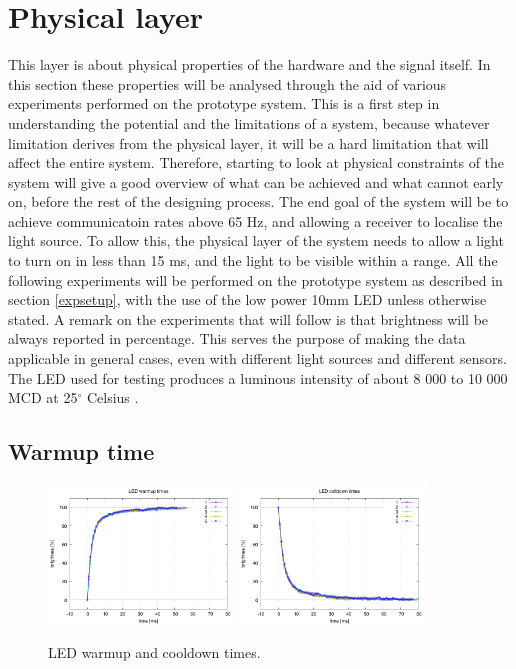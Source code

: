 \section{Physical layer}
\label{physical}

This layer is about physical properties of the hardware and the signal itself.
In this section these properties will be analysed through the aid of various experiments performed on the prototype system.
This is a first step in understanding the potential and the limitations of a system, because whatever limitation derives from the physical layer, it will be a hard limitation that will affect the entire system.
Therefore, starting to look at physical constraints of the system will give a good overview of what can be achieved and what cannot early on, before the rest of the designing process.
The end goal of the system will be to achieve communicatoin rates above 65 Hz, and allowing a receiver to localise the light source.
To allow this, the physical layer of the system needs to allow a light to turn on in less than 15 ms, and the light to be visible within a range.
All the following experiments will be performed on the prototype system as described in section \ref{expsetup}, with the use of the low power 10mm LED unless otherwise stated.
A remark on the experiments that will follow is that brightness will be always reported in percentage.
This serves the purpose of making the data applicable in general cases, even with different light sources and different sensors.
The LED used for testing produces a luminous intensity of about 8 000 to 10 000 MCD at 25$^{\circ}$ Celsius \cite{ledDS}.

\subsection{Warmup time}

\begin{figure}[h]
\centering
\includegraphics[height=140px]{img/warmup1}
\includegraphics[height=140px]{img/warmdown1}
\caption{LED warmup and cooldown times.}
\label{fig:warmup}
\end{figure}

